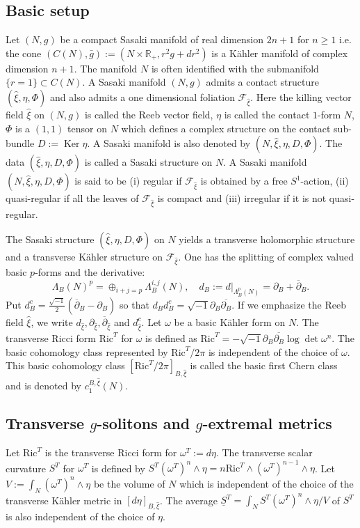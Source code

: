 \documentclass[12pt]{amsart}
\numberwithin{equation}{section}%
\theoremstyle{plain}
\theoremstyle{definition}
\newcommand{\Ker}[0]{\operatorname{Ker}}
\newcommand{\deldelb}{\sqrt{-1}\partial_{B} \overline{\partial_{B}}}
\newcommand{\dbar}{\overline{\partial}}
\newcommand{\Ric}{\mathrm{Ric}}
\renewcommand{\geq}{\geqslant}
\newcommand{\1}{\mathbf{1}}
\begin{document}
\subsection{Basic setup}
Let $(N,g)$ be a compact Sasaki manifold of real dimension $2n+1$ for $n\geq 1$ i.e.
the cone $(C(N), \bar{g}):=(N\times\mathbb{R}_{+}, r^{2}g+dr^{2})$ is a K\"ahler manifold
of complex dimension $n+1$.
The manifold $N$ is often identified with the submanifold $\{r=1\}\subset C(N)$.
A Sasaki manifold $(N,g)$ admits a contact structure $(\hat{\xi}, \eta,\Phi)$
and also admits a one dimensional foliation $\mathcal{F}_{\hat{\xi}}$.
Here the killing vector field $\hat{\xi}$ on $(N,g)$ is called the Reeb vector field,
$\eta$ is called the contact $1$-form $N$,
$\Phi$ is a $(1,1)$ tensor on $N$ which defines a complex structure on the contact sub-bundle
$D:=\Ker\eta$.
A Sasaki manifold is also denoted by $(N,\hat{\xi},\eta,D,\Phi)$.
The data $(\hat{\xi},\eta,D,\Phi)$ is called a Sasaki structure on $N$.
A Sasaki manifold $(N,\hat{\xi},\eta,D,\Phi)$ is said to be
(i) regular if $\mathcal{F}_{\hat{\xi}}$ is obtained by a free $S^{1}$-action,
(ii) quasi-regular if all the leaves of
$\mathcal{F}_{\hat{\xi}}$ is compact
and (iii) irregular if it is not quasi-regular.

The Sasaki structure $(\hat{\xi},\eta,D,\Phi)$ on $N$
yields a transverse holomorphic structure
and a transverse K\"ahler structure on $\mathcal{F}_{\hat{\xi}}$.
One has the splitting of
complex valued basic $p$-forms and the derivative:
\begin{equation}
\Lambda_{B}(N)^{p}=\oplus_{i+j=p}\Lambda_{B}^{i,j}(N),
\quad d_{B}:=d|_{\Lambda_{B}^{p}(N)}=\partial_{B}+\dbar_{B}.
\end{equation}
Put $d_{B}^{c}=\frac{\sqrt{-1}}{2}(\dbar_{B}-\partial_{B})$ so that
$d_{B}d_{B}^{c}=\deldelb$.
If we emphasize the Reeb field $\hat{\xi}$, we write
$d_{\hat{\xi}}, \partial_{\hat{\xi}}, \dbar_{\hat{\xi}}$ and $d^{c}_{\hat{\xi}}$.
Let $\omega$ 
be a basic K\"ahler form on $N$.
The transverse Ricci form $\Ric^{T}$ for $\omega$ is defined as
$\Ric^{T}=-\deldelb\log\det\omega^{n}$.
The basic cohomology class represented by $\Ric^{T}/2\pi$ is independent of the choice
of $\omega$.
This basic cohomology class $[\Ric^{T}/2\pi]_{B,\hat{\xi}}$ is called the basic first Chern class
and is denoted by $c^{B,\hat{\xi}}_{1}(N)$.
\subsection{Transverse $g$-solitons and $g$-extremal metrics}
Let $\Ric^{T}$ is the transverse Ricci form for
$\omega^{T}:=d\eta$.
The transverse scalar curvature $S^{T}$ for $\omega^{T}$ is defined by
$S^{T}(\omega^{T})^{n}\wedge\eta
=n\Ric^{T}\wedge(\omega^{T})^{n-1}\wedge\eta$.
Let $V:=\int_{N}(\omega^{T})^{n}\wedge\eta$ be the volume of $N$
which is independent of the choice of the transverse K\"ahler metric in
$[d\eta]_{B,\hat{\xi}}$.
The average
$\underline{S}^{T}=\int_{N}S^{T}(\omega^{T})^{n}\wedge\eta/V$
of $S^{T}$ is also independent of the choice of $\eta$.
\end{document}
